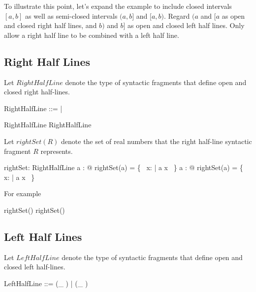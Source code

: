 \documentclass{amsart}
\begin{document}
To illustrate this point, let's expand the example to include closed intervals $[a,b]$ as well as semi-closed intervals
$(a,b]$ and $[a,b)$.
Regard $(a$ and $[a$ as open and closed right half lines, and $b)$ and $b]$ as open and closed left half lines.
Only allow a right half line to be combined with a left half line.

\subsection{Right Half Lines}

Let \hypertarget{RightHalfLine}{$RightHalfLine$} denote the type of syntactic fragments that define open and closed right half-lines.

\begin{zed}
	RightHalfLine ::= \openLowerBound \ldata \R \rdata | \closedLowerBound \ldata \R \rdata
\end{zed}

\begin{example}

\begin{zed}
	\openLowerBound \zeroR \in RightHalfLine
\also
	\closedLowerBound \oneR \in RightHalfLine
\end{zed}

\end{example}

Let $rightSet(R)$ denote the set of real numbers that the right half-line syntactic fragment $R$ represents.

\begin{axdef}
	rightSet: RightHalfLine \fun \power \R
\where
	\forall a : \R @ rightSet(\openLowerBound a) = \{~ x: \R | a \ltR x ~\}
\also
	\forall a : \R @ rightSet(\closedLowerBound a) = \{~ x: \R | a \leR x ~\}
\end{axdef}

For example

\begin{zed}
	\zeroR \notin rightSet(\openLowerBound \zeroR)
\also
	\oneR \in rightSet(\closedLowerBound \oneR)
\end{zed}

\subsection{Left Half Lines}

Let $LeftHalfLine$ denote the type of syntactic fragments that define open and closed left half-lines.

\begin{zed}
	LeftHalfLine ::= (\_ \openUpperBound)  \ldata \R \rdata | (\_ \closedUpperBound)  \ldata \R \rdata
\end{zed}
\end{document}
